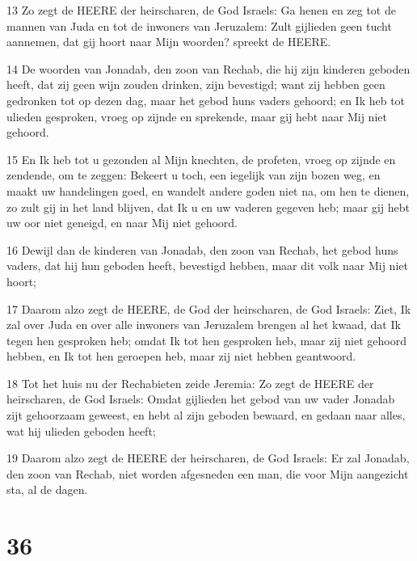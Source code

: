 \par 13 Zo zegt de HEERE der heirscharen, de God Israels: Ga henen en zeg tot de mannen van Juda en tot de inwoners van Jeruzalem: Zult gijlieden geen tucht aannemen, dat gij hoort naar Mijn woorden? spreekt de HEERE.
\par 14 De woorden van Jonadab, den zoon van Rechab, die hij zijn kinderen geboden heeft, dat zij geen wijn zouden drinken, zijn bevestigd; want zij hebben geen gedronken tot op dezen dag, maar het gebod huns vaders gehoord; en Ik heb tot ulieden gesproken, vroeg op zijnde en sprekende, maar gij hebt naar Mij niet gehoord.
\par 15 En Ik heb tot u gezonden al Mijn knechten, de profeten, vroeg op zijnde en zendende, om te zeggen: Bekeert u toch, een iegelijk van zijn bozen weg, en maakt uw handelingen goed, en wandelt andere goden niet na, om hen te dienen, zo zult gij in het land blijven, dat Ik u en uw vaderen gegeven heb; maar gij hebt uw oor niet geneigd, en naar Mij niet gehoord.
\par 16 Dewijl dan de kinderen van Jonadab, den zoon van Rechab, het gebod huns vaders, dat hij hun geboden heeft, bevestigd hebben, maar dit volk naar Mij niet hoort;
\par 17 Daarom alzo zegt de HEERE, de God der heirscharen, de God Israels: Ziet, Ik zal over Juda en over alle inwoners van Jeruzalem brengen al het kwaad, dat Ik tegen hen gesproken heb; omdat Ik tot hen gesproken heb, maar zij niet gehoord hebben, en Ik tot hen geroepen heb, maar zij niet hebben geantwoord.
\par 18 Tot het huis nu der Rechabieten zeide Jeremia: Zo zegt de HEERE der heirscharen, de God Israels: Omdat gijlieden het gebod van uw vader Jonadab zijt gehoorzaam geweest, en hebt al zijn geboden bewaard, en gedaan naar alles, wat hij ulieden geboden heeft;
\par 19 Daarom alzo zegt de HEERE der heirscharen, de God Israels: Er zal Jonadab, den zoon van Rechab, niet worden afgesneden een man, die voor Mijn aangezicht sta, al de dagen.

\chapter{36}

